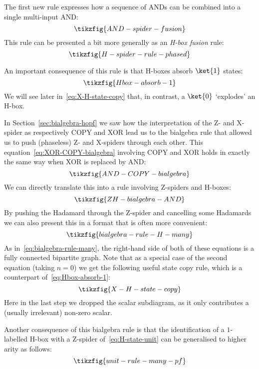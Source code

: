 \documentclass[a4paper,onecolumn,superscriptaddress,11pt,%
				unpublished,%
				allowfontchageintitle,%
				]{quantumarticle}
\begin{document}
The first new rule expresses how a sequence of ANDs can be combined into a single multi-input AND:
\begin{equation}
\tikzfig{AND-spider-fusion}
\end{equation}
This rule can be presented a bit more generally as an \emph{H-box fusion} rule:
\begin{equation}\label{eq:Hbox-spider}
	\tikzfig{H-spider-rule-phased}
\end{equation}

An important consequence of this rule is that H-boxes absorb $\ket{1}$ states:
\begin{equation}\label{eq:Hbox-absorb-1}
	\tikzfig{Hbox-absorb-1}
\end{equation}
We will see later in~\eqref{eq:X-H-state-copy} that, in contrast, a $\ket{0}$ `explodes' an H-box.

In Section~\ref{sec:bialgebra-hopf} we saw how the interpretation of the Z- and X-spider as respectively COPY and XOR lead us to the bialgebra rule that allowed us to push (phaseless) Z- and X-spiders through each other. This equation~\eqref{eq:XOR-COPY-bialgebra} involving COPY and XOR holds in exactly the same way when XOR is replaced by AND:
\begin{equation}
\tikzfig{AND-COPY-bialgebra}
\end{equation}
We can directly translate this into a rule involving Z-spiders and H-boxes:
\begin{equation}\label{eq:ZH-bialgebra-AND}
	\tikzfig{ZH-bialgebra-AND}
\end{equation}
By pushing the Hadamard through the Z-spider and cancelling some Hadamards we can also present this in a format that is often more convenient:
\begin{equation}\label{eq:ZH-bialgebra}
	\tikzfig{bialgebra-rule-H-many}
\end{equation}
As in~\eqref{eq:bialgebra-rule-many}, the right-hand side of both of these equations is a fully connected bipartite graph.
Note that as a special case of the second equation (taking $n=0$) we get the following useful state copy rule, which is a counterpart of~\eqref{eq:Hbox-absorb-1}:
\begin{equation}\label{eq:X-H-state-copy}
	\tikzfig{X-H-state-copy}
\end{equation}
Here in the last step we dropped the scalar subdiagram, as it only contributes a (usually irrelevant) non-zero scalar.

Another consequence of this bialgebra rule is that the identification of a $1$-labelled H-box with a Z-spider of~\eqref{eq:H-state-unit} can be generalised to higher arity as follows:
\begin{equation}\label{eq:unit-rule-many}
\tikzfig{unit-rule-many-pf}
\end{equation}
\end{document}
